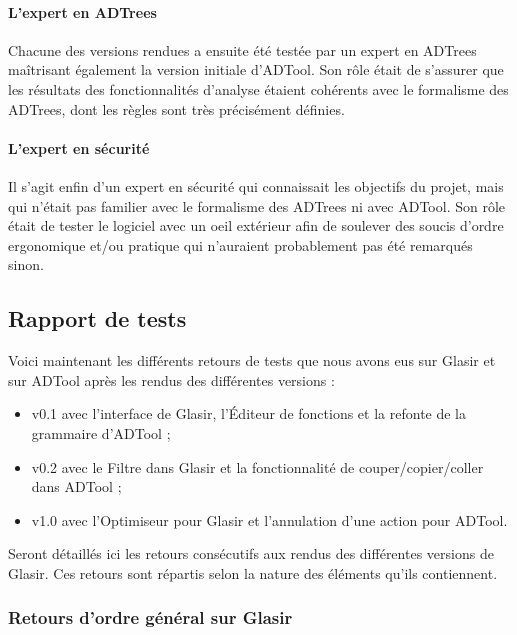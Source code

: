 \paragraph{L'expert en ADTrees} Chacune des versions rendues a ensuite été testée par un expert en ADTrees maîtrisant également la version initiale d'ADTool. Son rôle était de s'assurer que les résultats des fonctionnalités d'analyse étaient cohérents avec le formalisme des ADTrees, dont les règles sont très précisément définies.

\paragraph{L'expert en sécurité} Il s'agit enfin d'un expert en sécurité qui connaissait les objectifs du projet, mais qui n'était pas familier avec le formalisme des ADTrees ni avec ADTool. Son rôle était de tester le logiciel avec un oeil \og extérieur \fg{} afin de soulever des soucis d'ordre ergonomique et/ou pratique qui n'auraient probablement pas été remarqués sinon.


\subsection{Rapport de tests}
\label{subsec:tests}

Voici maintenant les différents retours de tests que nous avons eus sur Glasir et sur ADTool après les rendus des différentes versions : 
\begin{itemize}
	\item v0.1 avec l'interface de Glasir, l'Éditeur de fonctions et la refonte de la grammaire d'ADTool ;
	\item v0.2 avec le Filtre dans Glasir et la fonctionnalité de couper/copier/coller dans ADTool ;
	\item v1.0 avec l'Optimiseur pour Glasir et l'annulation d'une action pour ADTool.
\end{itemize}

Seront détaillés ici les retours consécutifs aux rendus des différentes versions de Glasir. Ces retours sont répartis selon la nature des éléments qu'ils contiennent.

\subsubsection{Retours d'ordre général sur Glasir}
\label{subsubsec:fonctglob}

